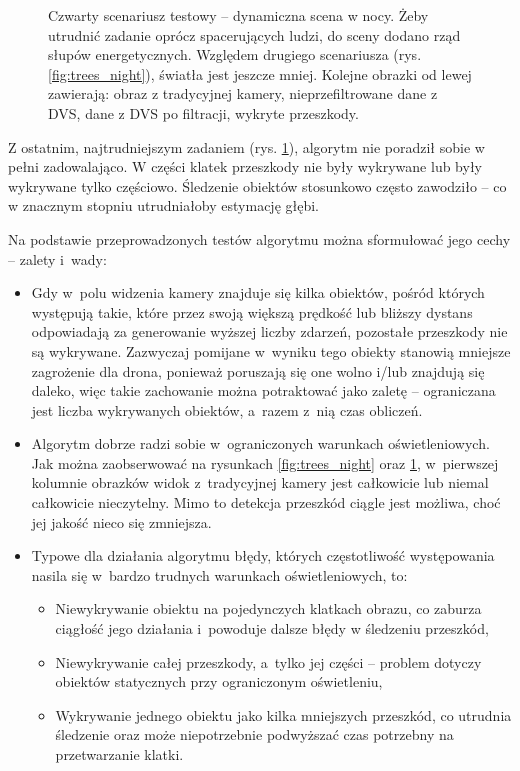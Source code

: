 \begin{figure}
    \caption{Czwarty scenariusz testowy -- dynamiczna scena w nocy. Żeby utrudnić zadanie oprócz spacerujących ludzi, do sceny dodano rząd słupów energetycznych. Względem drugiego scenariusza (rys. \ref{fig:trees_night}), światła jest jeszcze mniej. Kolejne obrazki od lewej zawierają: obraz z tradycyjnej kamery, nieprzefiltrowane dane z DVS, dane z DVS po filtracji, wykryte przeszkody.}
    \label{fig:walk_night}
\end{figure}

\vspace{11px}
Z ostatnim, najtrudniejszym zadaniem (rys. \ref{fig:walk_night}), algorytm nie poradził sobie w pełni zadowalająco. W części klatek przeszkody nie były wykrywane lub były wykrywane tylko częściowo. Śledzenie obiektów stosunkowo często zawodziło -- co w znacznym stopniu utrudniałoby estymację głębi.

Na podstawie przeprowadzonych testów algorytmu można sformułować jego cechy -- zalety i~wady:
\begin{itemize}
    \item Gdy w~polu widzenia kamery znajduje się kilka obiektów, pośród których występują takie, które przez swoją większą prędkość lub bliższy dystans odpowiadają za generowanie wyższej liczby zdarzeń, pozostałe przeszkody nie są wykrywane. Zazwyczaj pomijane w~wyniku tego obiekty stanowią mniejsze zagrożenie dla drona, ponieważ poruszają się one wolno i/lub znajdują się daleko, więc takie zachowanie można potraktować jako zaletę -- ograniczana jest liczba wykrywanych obiektów, a~razem z~nią czas obliczeń.
    \item Algorytm dobrze radzi sobie w~ograniczonych warunkach oświetleniowych. Jak można zaobserwować na rysunkach \ref{fig:trees_night} oraz \ref{fig:walk_night}, w~pierwszej kolumnie obrazków widok z~tradycyjnej kamery jest całkowicie lub niemal całkowicie nieczytelny. Mimo to detekcja przeszkód ciągle jest możliwa, choć jej jakość nieco się zmniejsza.
    \item Typowe dla działania algorytmu błędy, których częstotliwość występowania nasila się w~bardzo trudnych warunkach oświetleniowych, to:
    \begin{itemize}
        \item Niewykrywanie obiektu na pojedynczych klatkach obrazu, co zaburza ciągłość jego działania i~powoduje dalsze błędy w śledzeniu przeszkód,
        \item Niewykrywanie całej przeszkody, a~tylko jej części -- problem dotyczy obiektów statycznych przy ograniczonym oświetleniu,
        \item Wykrywanie jednego obiektu jako kilka mniejszych przeszkód, co utrudnia śledzenie oraz może niepotrzebnie podwyższać czas potrzebny na przetwarzanie klatki.
    \end{itemize}
\end{itemize}
 



